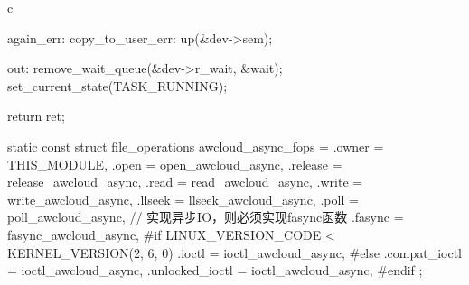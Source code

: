 \begin{code-block}{c}
{again_err:
copy_to_user_err:
        up(&dev->sem);

out:
        remove_wait_queue(&dev->r_wait, &wait);
        set_current_state(TASK_RUNNING);

        return ret;
}

static const struct file_operations awcloud_async_fops = {
        .owner          = THIS_MODULE,
        .open           = open_awcloud_async,
        .release        = release_awcloud_async,
        .read           = read_awcloud_async,
        .write          = write_awcloud_async,
        .llseek         = llseek_awcloud_async,
        .poll           = poll_awcloud_async,
        // 实现异步IO，则必须实现fasync函数
        .fasync         = fasync_awcloud_async,
#if LINUX_VERSION_CODE < KERNEL_VERSION(2, 6, 0)
        .ioctl          = ioctl_awcloud_async,
#else
        .compat_ioctl   = ioctl_awcloud_async,
        .unlocked_ioctl = ioctl_awcloud_async,
#endif
};
\end{code-block}

